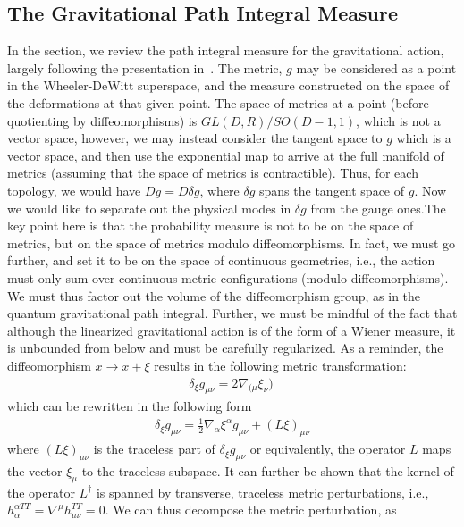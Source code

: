 \documentclass[aps,preprintnumbers,superscriptaddress,longbibliography]{revtex4-1}
\begin{document}
\subsection{The Gravitational Path Integral Measure}
\label{GPIM}

In the section, we review the path integral measure for the gravitational action, largely following the presentation in~\cite{MAZUR}.
The metric, $g$ may be considered as a point in the Wheeler-DeWitt superspace, and the measure constructed on the space of the deformations at that given point. The space of metrics at a point (before quotienting by diffeomorphisms) is $GL(D,R)/SO(D-1,1)$, which is not a vector space, however, we may instead consider the tangent space to $g$ which is a vector space, and then use the exponential map to arrive at the full manifold of metrics (assuming that the space of metrics is contractible). Thus, for each topology, we would have 
$Dg=D\delta g$, where $\delta g$ spans the tangent space of $g$.
Now we would like to separate out the physical modes in $\delta g$ from the gauge ones.The key point here is that the probability measure is not to be on the space of metrics, but on the space of metrics modulo diffeomorphisms. In fact, we must go further, and set it to be on the space of continuous geometries, i.e., the action must only sum over continuous metric configurations (modulo diffeomorphisms). We must thus factor out the volume of the diffeomorphism group, as in the quantum gravitational path integral. Further, we must be mindful of the fact that although the linearized gravitational action is of the form of a Wiener measure, it is unbounded from below and must be carefully regularized. As a reminder, the diffeomorphism $x\rightarrow x+\xi$ results in the following metric transformation:
\begin{align}
    \delta_\xi g_{\mu\nu}=2\nabla_{(\mu}\xi_{\nu})\
\end{align}
which can be rewritten in the following form
\begin{align}
    \delta_\xi g_{\mu\nu}=\frac{1}{2}\nabla_{\alpha}\xi^{\alpha}g_{\mu\nu}+(L\xi)_{\mu\nu}
\end{align}
where $(L\xi)_{\mu\nu}$ is the traceless part of $\delta_\xi g_{\mu\nu}$ or equivalently, the operator $L$ maps the vector $\xi_{\mu}$ to the traceless subspace. It can further be shown that the kernel of the operator $L^\dagger$ is spanned by transverse, traceless metric perturbations, i.e., $h_{\alpha}^{\alpha TT}=\nabla^{\mu}h_{\mu\nu}^{TT}=0$. We can thus decompose the metric perturbation, as
\end{document}
